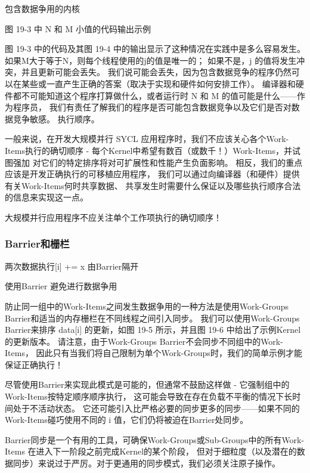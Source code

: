  {\color{red} 包含数据争用的内核}
 
 {\color{red} 图 19-3 中 N 和 M 小值的代码输出示例}

图 19-3 中的代码及其图 19-4 中的输出显示了这种情况在实践中是多么容易发生。 
如果M大于等于N，则每个线程使用的j的值是唯一的； 如果不是，j 的值将发生冲突，并且更新可能会丢失。 
我们说可能会丢失，因为包含数据竞争的程序仍然可以在某些或一直产生正确的答案（取决于实现和硬件如何安排工作）。 
编译器和硬件都不可能知道这个程序打算做什么，或者运行时 N 和 M 的值可能是什么——作为程序员，
我们有责任了解我们的程序是否可能包含数据竞争以及它们是否对数据竞争敏感。 执行顺序。

一般来说，在开发大规模并行 SYCL 应用程序时，我们不应该关心各个Work-Items执行的确切顺序 
- 每个Kernel中希望有数百（或数千！）Work-Items，并试图强加 对它们的特定排序将对可扩展性和性能产生负面影响。 
相反，我们的重点应该是开发正确执行的可移植应用程序，
我们可以通过向编译器（和硬件）提供有关Work-Items何时共享数据、
共享发生时需要什么保证以及哪些执行顺序合法的信息来实现这一点。

\begin{remark}
	大规模并行应用程序不应关注单个工作项执行的确切顺序！
\end{remark}

\subsubsection{Barrier和栅栏}
{\color{red} 两次数据执行[i] += x 由Barrier隔开}

{\color{red} 使用Barrier 避免进行数据争用}

防止同一组中的Work-Items之间发生数据争用的一种方法是使用Work-Groups Barrier和适当的内存栅栏在不同线程之间引入同步。 
我们可以使用Work-Groups Barrier来排序 data[i] 的更新，如图 19-5 所示，并且图 19-6 中给出了示例Kernel的更新版本。 
请注意，由于Work-Groups Barrier不会同步不同组中的Work-Items，
因此只有当我们将自己限制为单个Work-Groups时，我们的简单示例才能保证正确执行！

尽管使用Barrier来实现此模式是可能的，但通常不鼓励这样做 - 它强制组中的Work-Items按特定顺序顺序执行，
这可能会导致在存在负载不平衡的情况下长时间处于不活动状态。 
它还可能引入比严格必要的同步更多的同步——如果不同的Work-Items碰巧使用不同的 i 值，它们仍将被迫在Barrier处同步。

Barrier同步是一个有用的工具，可确保Work-Groups或Sub-Groups中的所有Work-Items
在进入下一阶段之前完成Kernel的某个阶段，
但对于细粒度（以及潜在的数据同步）来说过于严厉。对于更通用的同步模式，我们必须关注原子操作。

